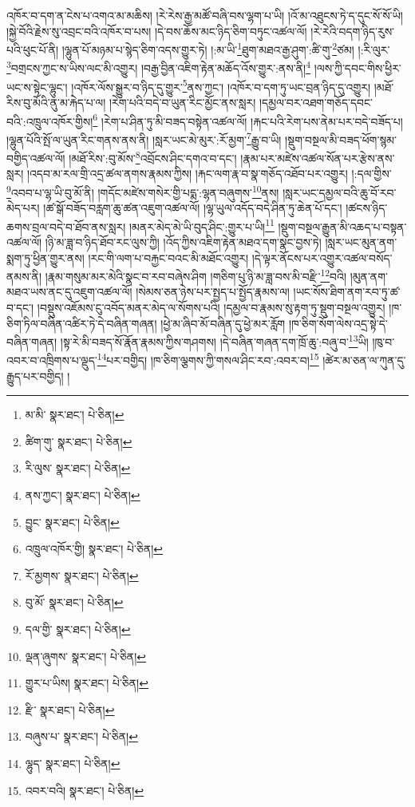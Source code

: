 འཁོར་བ་དག་ན་ངེས་པ་འགའ་མ་མཆིས། །རེ་རེས་རྒྱ་མཚོ་བཞི་བས་ལྷག་པ་ཡི། །འོ་མ་འཐུངས་ཏེ་ད་དུང་སོ་སོ་ཡི། །སྐྱེ་བོའི་རྗེས་སུ་འབྲང་བའི་འཁོར་བ་པས། །དེ་བས་ཆོས་མང་ཉིད་ཅིག་བཏུང་འཚལ་ལོ། །རེ་རེའི་བདག་ཉིད་རུས་པའི་ཕུང་པོ་ནི། །ལྷུན་པོ་མཉམ་པ་སྙེད་ཅིག་འདས་གྱུར་ཏེ། །:མ་ཡི་\footnote{མ་མི་  སྣར་ཐང་།  པེ་ཅིན། }ཐུག་མཐའ་རྒྱ་ཤུག་:ཚི་གུ་\footnote{ཚིག་གུ་  སྣར་ཐང་།  པེ་ཅིན། }ཙམ། །:རི་ལུར་\footnote{རི་ལུས་  སྣར་ཐང་།  པེ་ཅིན། }བགྲངས་ཀྱང་ས་ཡིས་ལང་མི་འགྱུར། །བརྒྱ་བྱིན་འཇིག་རྟེན་མཆོད་འོས་གྱུར་:ནས་ནི།\footnote{ནས་ཀྱང་།  སྣར་ཐང་།  པེ་ཅིན། } །ལས་ཀྱི་དབང་གིས་ཕྱིར་ཡང་ས་སྟེང་ལྷུང་། །འཁོར་ལོས་སྒྱུར་བ་ཉིད་དུ་གྱུར་\footnote{བྱུང་  སྣར་ཐང་།  པེ་ཅིན། }ནས་ཀྱང་། །འཁོར་བ་དག་ཏུ་ཡང་བྲན་ཉིད་དུ་འགྱུར། །མཐོ་རིས་བུ་མོའི་ནུ་མ་རྐེད་པ་ལ། །རེག་པའི་བདེ་བ་ཡུན་རིང་མྱོང་ནས་སླར། །དམྱལ་བར་འཐག་གཅོད་དབང་བའི་:འཁྲུལ་འཁོར་གྱིས།\footnote{འཁྲུལ་འཁོར་གྱི།  སྣར་ཐང་།  པེ་ཅིན། } །རེག་པ་ཤིན་ཏུ་མི་བཟད་བསྟེན་འཚལ་ལོ། །རྐང་པའི་རེག་པས་ནེམ་པར་བདེ་བཟོད་པ། །ལྷུན་པོའི་སྤོ་ལ་ཡུན་རིང་གནས་ནས་ནི། །སླར་ཡང་མེ་མུར་:རོ་མྱག་\footnote{རོ་མྱགས་  སྣར་ཐང་།  པེ་ཅིན། }རྒྱུ་བ་ཡི། །སྡུག་བསྔལ་མི་བཟད་ཕོག་སྙམ་བགྱིད་འཚལ་ལོ། །མཐོ་རིས་:བུ་མོས་\footnote{བུ་མོ་  སྣར་ཐང་།  པེ་ཅིན། }འབྲོངས་ཤིང་དགའ་བ་དང་། །རྣམ་པར་མཛེས་འཚལ་སོན་པར་རྩེས་ནས་སླར། །འདབ་མ་རལ་གྲི་འདྲ་ཚལ་ནགས་རྣམས་ཀྱིས། །རྐང་ལག་རྣ་བ་སྣ་གཅོད་འཐོབ་པར་འགྱུར། །:དལ་གྱིས་\footnote{དལ་གྱི་  སྣར་ཐང་།  པེ་ཅིན། }འབབ་པ་ལྷ་ཡི་བུ་མོ་ནི། །གདོང་མཛེས་གསེར་གྱི་པདྨ་:ལྷན་བཞུགས་\footnote{ལྡན་ཞུགས་  སྣར་ཐང་།  པེ་ཅིན། }ནས། །སླར་ཡང་དམྱལ་བའི་ཆུ་བོ་རབ་མེད་པར། །ཚ་སྒོ་བཟོད་བརླག་ཆུ་ཚན་འཇུག་འཚལ་ལོ། །ལྷ་ཡུལ་འདོད་བདེ་ཤིན་ཏུ་ཆེན་པོ་དང་། །ཚངས་ཉིད་ཆགས་བྲལ་བདེ་བ་ཐོབ་ནས་སླར། །མནར་མེད་མེ་ཡི་བུད་ཤིང་:གྱུར་པ་ཡི།\footnote{གྱུར་པ་ཡིས།  སྣར་ཐང་།  པེ་ཅིན། } །སྡུག་བསྔལ་རྒྱུན་མི་འཆད་པ་བསྟན་འཚལ་ལོ། །ཉི་མ་ཟླ་བ་ཉིད་ཐོབ་རང་ལུས་ཀྱི། །འོད་ཀྱིས་འཇིག་རྟེན་མཐའ་དག་སྣང་བྱས་ཏེ། །སླར་ཡང་མུན་ནག་སྨག་ཏུ་ཕྱིན་གྱུར་ནས། །རང་གི་ལག་པ་བརྐྱང་བའང་མི་མཐོང་འགྱུར། །དེ་ལྟར་ནོངས་པར་འགྱུར་འཚལ་བསོད་ནམས་ནི། །རྣམ་གསུམ་མར་མེའི་སྣང་བ་རབ་བཞེས་ཤིག །གཅིག་པུ་ཉི་མ་ཟླ་བས་མི་བརྫི་\footnote{རྫི་  སྣར་ཐང་།  པེ་ཅིན། }བའི། །མུན་ནག་མཐའ་ཡས་ནང་དུ་འཇུག་འཚལ་ལོ། །སེམས་ཅན་ཉེས་པར་སྤྱད་པ་སྤྱོད་རྣམས་ལ། །ཡང་སོས་ཐིག་ནག་རབ་ཏུ་ཚ་བ་དང་། །བསྡུས་འཇོམས་ངུ་འབོད་མནར་མེད་ལ་སོགས་པའི། །དམྱལ་བ་རྣམས་སུ་རྟག་ཏུ་སྡུག་བསྔལ་འགྱུར། །ཁ་ཅིག་ཏིལ་བཞིན་འཚིར་ཏེ་དེ་བཞིན་གཞན། །ཕྱེ་མ་ཞིབ་མོ་བཞིན་དུ་ཕྱེ་མར་རློག །ཁ་ཅིག་སོག་ལེས་འདྲ་སྟེ་དེ་བཞིན་གཞན། །སྟ་རེ་མི་བཟད་སོ་རྣོན་རྣམས་ཀྱིས་གཤགས། །དེ་བཞིན་གཞན་དག་ཁྲོ་ཆུ་:བཞུ་བ་\footnote{བཞུས་པ་  སྣར་ཐང་།  པེ་ཅིན། }ཡི། །ཁུ་བ་འབར་བ་འཁྲིགས་པ་ལྡུད་\footnote{ལྷུད་  སྣར་ཐང་།  པེ་ཅིན། }པར་བགྱིད། །ཁ་ཅིག་ལྕགས་ཀྱི་གསལ་ཤིང་རབ་:འབར་བ།\footnote{འབར་བའི།  སྣར་ཐང་།  པེ་ཅིན། } །ཚེར་མ་ཅན་ལ་ཀུན་དུ་རྒྱུད་པར་བགྱིད། །
